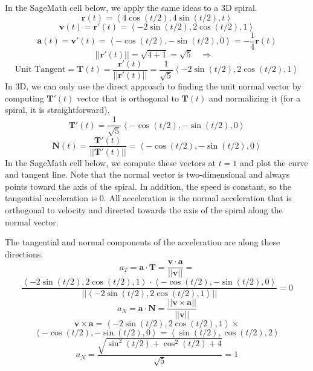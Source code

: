 In the SageMath cell below, we apply the same ideas to a 3D spiral.
$$\mathbf{r}(t) = \left<  4\cos(t/2),4\sin(t/2),t \right> $$
$$ \mathbf{v}(t) =\mathbf{r'}(t) = \left< -2\sin(t/2),2\cos(t/2),1 \right> $$
$$ \mathbf{a}(t) =\mathbf{v'}(t) = \left< -\cos(t/2),-\sin(t/2),0 \right> = -\frac{1}{4}\mathbf{r}(t) $$
$$ ||\mathbf{r'}(t)|| = \sqrt{4+1}=\sqrt{5}  \ \ \ \ \Rightarrow \ \ \  $$
$$\text{Unit Tangent} =  \mathbf{T}(t) = \frac{ \mathbf{r'}(t)}{ ||\mathbf{r'}(t)|| } = \frac{1}{\sqrt{5} }\left< -2\sin(t/2),2\cos(t/2),1 \right> $$
In 3D, we can only use the direct approach to finding the unit normal vector by computing $ \mathbf{T'}(t)$ vector that is orthogonal to $\mathbf{T}(t)$ and normalizing it (for a spiral, it is straightforward).
$$ \mathbf{T'}(t) =  \frac{1}{\sqrt{5} }\left< -\cos(t/2),-\sin(t/2),0 \right> $$
$$ \mathbf{N}(t) = \frac{ \mathbf{T'}(t)}{ ||\mathbf{T'}(t)|| } =\left< -\cos(t/2),-\sin(t/2),0 \right> $$
In the SageMath cell below, we compute these vectors at $t=1$ and plot the curve and tangent line.   Note that the normal vector is two-dimensional and always points toward the axis of the spiral.   In addition,  the speed is constant, so the tangential acceleration is 0.  All acceleration is the normal acceleration that is orthogonal to velocity and directed towards the axis of the spiral along the normal vector.

The tangential and normal components of the acceleration are along these directions.
$$ a_T = \mathbf{a} \cdot \mathbf{T} = \frac{\mathbf{v} \cdot \mathbf{a}}{||\mathbf{v}||} = $$
$$ \frac{ \left< -2\sin(t/2),2\cos(t/2),1 \right> \cdot  \left< -\cos(t/2),-\sin(t/2),0 \right>}{|| \left< -2\sin(t/2),2\cos(t/2),1 \right>||}  =0$$
$$ a_N = \mathbf{a} \cdot \mathbf{N} = \frac{||\mathbf{v} \times \mathbf{a}||}{||\mathbf{v}||} $$
$$ \mathbf{v} \times \mathbf{a} = \left< -2\sin(t/2),2\cos(t/2),1 \right>  \times  $$
$$ \left< -\cos(t/2),-\sin(t/2),0 \right>  =  \left< \sin(t/2),\cos(t/2),2 \right> $$
$$a_N = \frac{\sqrt{\sin^2(t/2)+\cos^2(t/2)+4}}{\sqrt{5}} =1 $$

